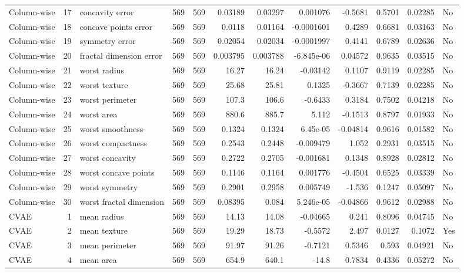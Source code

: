 \begin{longtable}{lrp{}rrrrrrrrl}
Column-wise & 17 & concavity error & 569 & 569 & 0.03189 & 0.03297 & 0.001076 & -0.5681 & 0.5701 & 0.02285 & No \\
Column-wise & 18 & concave points error & 569 & 569 & 0.0118 & 0.01164 & -0.0001601 & 0.4289 & 0.6681 & 0.03163 & No \\
Column-wise & 19 & symmetry error & 569 & 569 & 0.02054 & 0.02034 & -0.0001997 & 0.4141 & 0.6789 & 0.02636 & No \\
Column-wise & 20 & fractal dimension error & 569 & 569 & 0.003795 & 0.003788 & -6.845e-06 & 0.04572 & 0.9635 & 0.03515 & No \\
Column-wise & 21 & worst radius & 569 & 569 & 16.27 & 16.24 & -0.03142 & 0.1107 & 0.9119 & 0.02285 & No \\
Column-wise & 22 & worst texture & 569 & 569 & 25.68 & 25.81 & 0.1325 & -0.3667 & 0.7139 & 0.02285 & No \\
Column-wise & 23 & worst perimeter & 569 & 569 & 107.3 & 106.6 & -0.6433 & 0.3184 & 0.7502 & 0.04218 & No \\
Column-wise & 24 & worst area & 569 & 569 & 880.6 & 885.7 & 5.112 & -0.1513 & 0.8797 & 0.01933 & No \\
Column-wise & 25 & worst smoothness & 569 & 569 & 0.1324 & 0.1324 & 6.45e-05 & -0.04814 & 0.9616 & 0.01582 & No \\
Column-wise & 26 & worst compactness & 569 & 569 & 0.2543 & 0.2448 & -0.009479 & 1.052 & 0.2931 & 0.03515 & No \\
Column-wise & 27 & worst concavity & 569 & 569 & 0.2722 & 0.2705 & -0.001681 & 0.1348 & 0.8928 & 0.02812 & No \\
Column-wise & 28 & worst concave points & 569 & 569 & 0.1146 & 0.1164 & 0.001776 & -0.4504 & 0.6525 & 0.03339 & No \\
Column-wise & 29 & worst symmetry & 569 & 569 & 0.2901 & 0.2958 & 0.005749 & -1.536 & 0.1247 & 0.05097 & No \\
Column-wise & 30 & worst fractal dimension & 569 & 569 & 0.08395 & 0.084 & 5.246e-05 & -0.04866 & 0.9612 & 0.02988 & No \\
CVAE & 1 & mean radius & 569 & 569 & 14.13 & 14.08 & -0.04665 & 0.241 & 0.8096 & 0.04745 & No \\
CVAE & 2 & mean texture & 569 & 569 & 19.29 & 18.73 & -0.5572 & 2.497 & 0.0127 & 0.1072 & Yes \\
CVAE & 3 & mean perimeter & 569 & 569 & 91.97 & 91.26 & -0.7121 & 0.5346 & 0.593 & 0.04921 & No \\
CVAE & 4 & mean area & 569 & 569 & 654.9 & 640.1 & -14.8 & 0.7834 & 0.4336 & 0.05272 & No \\

\end{longtable}

